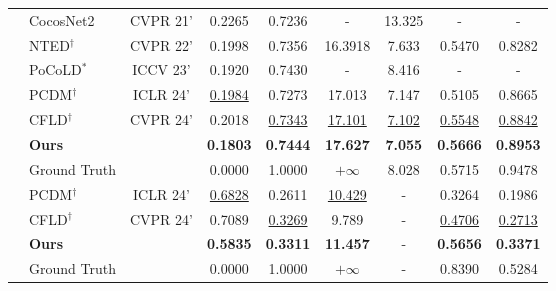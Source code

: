 \begin{tabular}{c l c c c c c c c}
    \midrule
            & CocosNet2\cite{zhou2021cocosnet} & CVPR 21' & 0.2265 & 0.7236 & - & 13.325 & - & -\\
             & NTED$^\dagger$\cite{ren2022neural} & CVPR 22' & 0.1998 & 0.7356 & 16.3918 & 7.633 & 0.5470 & 0.8282 \\
             & \color{gray}PoCoLD$^\ast$ \cite{han2023controllable} &  \color{gray}ICCV 23' &  \color{gray}0.1920 &  \color{gray}0.7430 & - &  \color{gray}8.416 & - & -\\
             & PCDM$^\dagger$\cite{shen2024advancing} & ICLR 24' & \underline{0.1984} & 0.7273 & 17.013 & 7.147 & 0.5105 & 0.8665 \\ %
             & CFLD$^\dagger$\cite{lu2024coarse} & CVPR 24' & 0.2018 & \underline{0.7343} & \underline{17.101} & \underline{7.102} & \underline{0.5548} & \underline{0.8842} \\ %
             & \textbf{Ours} &  & \textbf{0.1803} & \textbf{0.7444} & \textbf{17.627} & \textbf{7.055} & \textbf{0.5666} & \textbf{0.8953} \\
             &  \color{gray} Ground Truth &  & \color{gray}0.0000 & \color{gray} 1.0000 & \color{gray} $+\infty$  & \color{gray} 8.028 & \color{gray} 0.5715 & \color{gray} 0.9478\\
    \midrule
            & PCDM$^\dagger$\cite{shen2024advancing} & ICLR 24' & \underline{0.6828} & 0.2611 & \underline{10.429} & - & 0.3264 & 0.1986  \\
            & CFLD$^\dagger$\cite{lu2024coarse} & CVPR 24' & 0.7089 & \underline{0.3269} & 9.789 & - & \underline{0.4706} & \underline{0.2713}  \\
            & \textbf{Ours} & & \textbf{0.5835} & \textbf{0.3311} & \textbf{11.457} & - & \textbf{0.5656} & \textbf{0.3371} \\
            &  \color{gray} Ground Truth &  & \color{gray}0.0000 & \color{gray} 1.0000 & \color{gray} $+\infty$ & - & \color{gray} 0.8390 & \color{gray} 0.5284 \\
    \toprule
\end{tabular}
